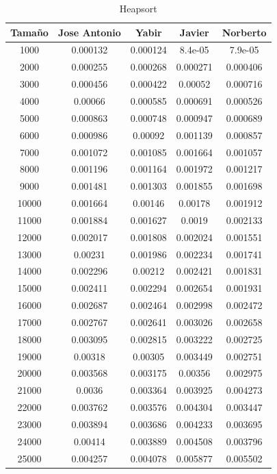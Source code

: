 \documentclass[11pt,a4paper]{article}
\begin{document}
\begin{table}[h]
	\centering
	\caption{Heapsort}
	\begin{tabular}{ | c | c  | c | c | c | }
		\hline
		Tama\~no & Jose Antonio & Yabir & Javier & Norberto\\
		\hline
		1000	&	0.000132	&	0.000124	&	8.4e-05	&	7.9e-05	\\
		2000	&	0.000255	&	0.000268	&	0.000271	&	0.000406	\\
		3000	&	0.000456	&	0.000422	&	0.00052	&	0.000716	\\
		4000	&	0.00066	&	0.000585	&	0.000691	&	0.000526	\\
		5000	&	0.000863	&	0.000748	&	0.000947	&	0.000689	\\
		6000	&	0.000986	&	0.00092	&	0.001139	&	0.000857	\\
		7000	&	0.001072	&	0.001085	&	0.001664	&	0.001057	\\
		8000	&	0.001196	&	0.001164	&	0.001972	&	0.001217	\\
		9000	&	0.001481	&	0.001303	&	0.001855	&	0.001698	\\
		10000	&	0.001664	&	0.00146	&	0.00178	&	0.001912	\\
		11000	&	0.001884	&	0.001627	&	0.0019	&	0.002133	\\
		12000	&	0.002017	&	0.001808	&	0.002024	&	0.001551	\\
		13000	&	0.00231	&	0.001986	&	0.002234	&	0.001741	\\
		14000	&	0.002296	&	0.00212	&	0.002421	&	0.001831	\\
		15000	&	0.002411	&	0.002294	&	0.002654	&	0.001931	\\
		16000	&	0.002687	&	0.002464	&	0.002998	&	0.002472	\\
		17000	&	0.002767	&	0.002641	&	0.003026	&	0.002658	\\
		18000	&	0.003095	&	0.002815	&	0.003222	&	0.002725	\\
		19000	&	0.00318	&	0.00305	&	0.003449	&	0.002751	\\
		20000	&	0.003568	&	0.003175	&	0.00356	&	0.002975	\\
		21000	&	0.0036	&	0.003364	&	0.003925	&	0.004273	\\
		22000	&	0.003762	&	0.003576	&	0.004304	&	0.003447	\\
		23000	&	0.003894	&	0.003686	&	0.004233	&	0.003695	\\
		24000	&	0.00414	&	0.003889	&	0.004508	&	0.003796	\\
		25000	&	0.004257	&	0.004078	&	0.005877	&	0.005502	\\
		\hline
	\end{tabular}
\end{table}
\end{document}

